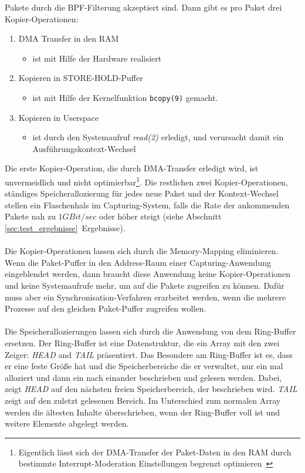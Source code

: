 Pakete durch die BPF-Filterung akzeptiert sind. Dann gibt es pro Paket drei
Kopier-Operationen:
\begin{enumerate}
\item DMA Transfer in den RAM
	\begin{itemize}
		\item ist mit Hilfe der Hardware realisiert
	\end{itemize}
\item Kopieren in STORE-HOLD-Puffer
	\begin{itemize}
		\item ist mit Hilfe der Kernelfunktion \verb+bcopy(9)+ gemacht. 
	\end{itemize}
\item Kopieren in Userspace
	\begin{itemize}
		\item ist durch den Systemaufruf \emph{read(2)} erledigt, und verursacht damit
			ein Ausführungskontext-Wechsel
	\end{itemize}
\end{enumerate}
Die erste Kopier-Operation, die durch DMA-Transfer erledigt wird, ist
unvermeidlich und nicht optimierbar\footnote{Eigentlich lässt sich der
DMA-Transfer der Paket-Daten in den RAM durch bestimmte Interrupt-Moderation
Einstellungen begrenzt optimieren~\cite{e1000_sdm}}. Die restlichen zwei
Kopier-Operationen, ständiges Speicherallozierung für jedes neue Paket und der
Kontext-Wechsel stellen ein Flaschenhals im Capturing-System, falls die Rate
der ankommenden Pakete nah zu $1GBit/sec$ oder höher steigt (siehe Abschnitt
\ref{sec:test_ergebnisse}~Ergebnisse).\\\\
%
Die Kopier-Operationen lassen sich durch die Memory-Mapping eliminieren. Wenn
die Paket-Puffer in den Address-Raum einer Capturing-Anwendung eingeblendet
werden, dann braucht diese Anwendung keine Kopier-Operationen und keine
Systemaufrufe mehr, um auf die Pakete zugreifen zu können. Dafür muss aber ein
Synchronisation-Verfahren erarbeitet werden, wenn die mehrere Prozesse auf den
gleichen Paket-Puffer zugreifen wollen.\\\\
%
Die Speicherallozierungen lassen sich durch die Anwendung von dem Ring-Buffer
ersetzen. Der Ring-Buffer ist eine Datenstruktur, die ein Array mit den zwei
Zeiger: \emph{HEAD} and \emph{TAIL} präsentiert. Das Besondere am Ring-Buffer
ist es, dass er eine feste Größe hat und die Speicherbereiche die er verwaltet,
nur ein mal alloziert und dann ein nach einander beschrieben und gelesen
werden. Dabei, zeigt \emph{HEAD} auf den nächsten freien Speicherbereich, der
beschrieben wird. \emph{TAIL} zeigt auf den zuletzt gelesenen Bereich. Im
Unterschied zum normalen Array werden die ältesten Inhalte überschrieben, wenn
der Ring-Buffer voll ist und weitere Elemente abgelegt werden.
%

